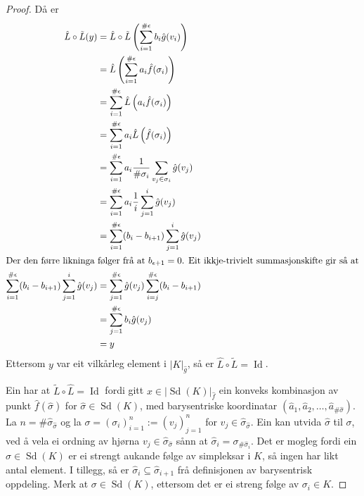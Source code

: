 \documentclass[a4paper, 12pt, norsk]{article}
\theoremstyle{plain}
\theoremstyle{definition}
\newcommand{\gr}[1]{ \lvert #1 \rvert } %
\newcommand{\tuple}[1]{ \left( #1 \right) } %
\DeclareMathOperator{\Sd}{Sd} %
\DeclareMathOperator{\Id}{Id} %
\begin{document}
\begin{proof}
	Då er
	\begin{align*} %
		\hat{L}\circ\tilde{L}(y) &= \hat{L}\circ\tilde{L}\tuple{\sum_{i=1}^{\#\epsilon} b_i \hat{g}(v_i)} \\
		&= \hat{L}\left( \sum_{i=1}^{\#\epsilon} a_i \hat{f}(\sigma_i) \right) \\
		&= \sum_{i=1}^{\#\epsilon} \hat{L} \left( a_i \hat{f}(\sigma_i) \right) \\
		&= \sum_{i=1}^{\#\epsilon} a_i \hat{L} \left( \hat{f}(\sigma_i) \right) \\
		&= \sum_{i=1}^{\#\epsilon} a_i \frac{1}{\#\sigma_i} \sum_{v_j \in \sigma_i} \hat{g}(v_j) \\
		&= \sum_{i=1}^{\#\epsilon} a_i \frac{1}{i} \sum_{j = 1}^{i} \hat{g}(v_j) \\
		&= \sum_{i=1}^{\#\epsilon} (b_{i}-b_{i+1}) \sum_{j = 1}^{i} \hat{g}(v_j) \\
		\intertext{Der den førre likninga følger frå at \( b_{\epsilon+1} = 0 \). Eit ikkje-trivielt summasjonskifte gir så at}
		\sum_{i=1}^{\#\epsilon} (b_{i}-b_{i+1}) \sum_{j = 1}^{i} \hat{g}(v_j) &= \sum_{j=1}^{\#\epsilon} \hat{g}(v_j) \sum_{i = j}^{\#\epsilon} (b_{i}-b_{i+1}) \\
		&= \sum_{j=1}^{\#\epsilon} b_i \hat{g}(v_j) \\
		&= y
	\end{align*}
	Ettersom \( y \) var eit vilkårleg element i \( \gr{K}_{\hat{g}} \), så er \( \hat{L}\circ\tilde{L} = \Id \).

	Ein har at \( \tilde{L}\circ\hat{L} = \Id \) fordi gitt \( x \in \gr{\Sd(K)}_{\hat{f}} \) ein konveks kombinasjon av punkt \( \hat{f}(\hat{\sigma}) \) for \( \hat{\sigma} \in \Sd(K) \), med barysentriske koordinatar \( \tuple{\hat{a}_1, \hat{a}_2, \dots, \hat{a}_{\#\hat{\sigma}}} \). La \( n = \#\hat{\sigma}_{\hat{\sigma}} \) og la \( \sigma = \tuple{\sigma_i}_{i=1}^{n} := \tuple{v_j}_{j=1}^{n} \) for \( v_j \in \hat{\sigma}_{\hat{\sigma}} \). Ein kan utvida \( \hat{\sigma} \) til \( \sigma \), ved å vela ei ordning av hjørna \( v_j \in \hat{\sigma}_{\hat{\sigma}} \) sånn at \( \hat{\sigma}_i = \sigma_{\#\hat{\sigma}_i} \). Det er mogleg fordi ein \( \hat{\sigma} \in \Sd(K) \) er ei strengt aukande følge av simpleksar i \( K \), så ingen har likt antal element. I tillegg, så er \( \hat{\sigma}_i \subseteq \hat{\sigma}_{i+1} \) frå definisjonen av barysentrisk oppdeling. Merk at \( \sigma \in \Sd(K) \), ettersom det er ei streng følge av \( \sigma_i \in K \).


\end{proof}
\end{document}

